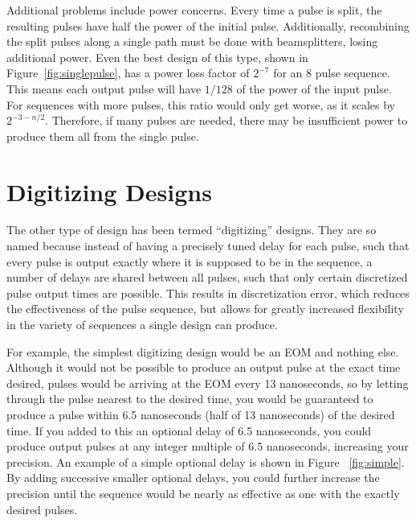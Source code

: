 \documentclass[pdftex,12pt,a4paper]{article}
\begin{document}
Additional problems include power concerns. Every time a pulse is split, the resulting pulses have half the power of the initial pulse. Additionally, recombining the split pulses along a single path must be done with beamsplitters, losing additional power. Even the best design of this type, shown in Figure~\ref{fig:singlepulse}, has a power loss factor of $2^{-7}$ for an 8 pulse sequence. This means each output pulse will have $1/128$ of the power of the input pulse. For sequences with more pulses, this ratio would only get worse, as it scales by $2^{-3-n/2}$. Therefore, if many pulses are needed, there may be insufficient power to produce them all from the single pulse.






\section{Digitizing Designs}
\label{sec:digitizing_designs}
The other type of design has been termed “digitizing” designs. They are so named because instead of having a precisely tuned delay for each pulse, such that every pulse is output exactly where it is supposed to be in the sequence, a number of delays are shared between all pulses, such that only certain discretized pulse output times are possible. This results in discretization error, which reduces the effectiveness of the pulse sequence, but allows for greatly increased flexibility in the variety of sequences a single design can produce.

For example, the simplest digitizing design would be an EOM and nothing else. Although it would not be possible to produce an output pulse at the exact time desired, pulses would be arriving at the EOM every 13 nanoseconds, so by letting through the pulse nearest to the desired time, you would be guaranteed to produce a pulse within 6.5 nanoseconds (half of 13 nanoseconds) of the desired time. If you added to this an optional delay of 6.5 nanoseconds, you could produce output pulses at any integer multiple of 6.5 nanoseconds, increasing your precision. An example of a simple optional delay is shown in Figure ~\ref{fig:simple}. By adding successive smaller optional delays, you could further increase the precision until the sequence would be nearly as effective as one with the exactly desired pulses.
    
\end{document}
